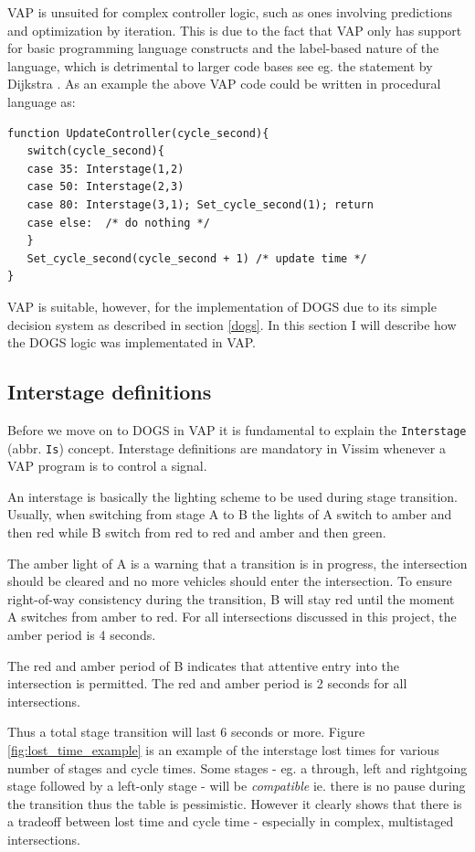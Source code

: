 VAP is unsuited for complex controller logic, such as ones involving predictions and optimization by iteration. This is due to the fact that VAP only has support for basic programming language constructs and the label-based nature of the language, which is detrimental to larger code bases see eg. the statement by Dijkstra \cite{nogoto}. As an example the above VAP code could be written in procedural language as:

\begin{verbatim}
function UpdateController(cycle_second){
   switch(cycle_second){
   case 35: Interstage(1,2)
   case 50: Interstage(2,3)
   case 80: Interstage(3,1); Set_cycle_second(1); return
   case else:  /* do nothing */
   }
   Set_cycle_second(cycle_second + 1) /* update time */
}
\end{verbatim}

VAP is suitable, however, for the implementation of DOGS due to its simple decision system as described in section \ref{dogs}. In this section I will describe how the DOGS logic was implementated in VAP.

\subsection{Interstage definitions}
Before we move on to DOGS in VAP it is fundamental to explain the \verb|Interstage| (abbr. \verb|Is|) concept. Interstage definitions are mandatory in Vissim whenever a VAP program is to control a signal.

An interstage is basically the lighting scheme to be used during stage transition. Usually, when switching from stage A to B the lights of A switch to amber and then red while B switch from red to red and amber and then green.

The amber light of A is a warning that a transition is in progress, the intersection should be cleared and no more vehicles should enter the intersection. To ensure right-of-way consistency during the transition, B will stay red until the moment A switches from amber to red. For all intersections discussed in this project, the amber period is 4 seconds.

The red and amber period of B indicates that attentive entry into the intersection is permitted. The red and amber period is 2 seconds for all intersections.

Thus a total stage transition will last 6 seconds or more. Figure \ref{fig:lost_time_example} is an example of the interstage lost times for various number of stages and cycle times. Some stages - eg. a through, left and rightgoing stage followed by a left-only stage - will be \textit{compatible} ie. there is no pause during the transition thus the table is pessimistic. However it clearly shows that there is a tradeoff between lost time and cycle time - especially in complex, multistaged intersections.

